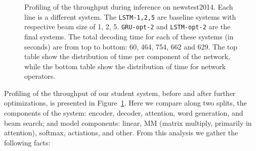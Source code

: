 \documentclass[11pt,a4paper]{article}
\begin{document}
\begin{figure}
\caption{\small Profiling of the throughput during inference on newstest2014. Each line is a different system. The {\tt LSTM-1,2,5} are baseline systems with respective beam size of 1, 2, 5. {\tt GRU-opt-2} and {\tt LSTM-opt-2} are the final systems. The total decoding time for each of these systems (in seconds) are from top to bottom: 60, 464, 754, 662 and 629. The top table show the distribution of time per component of the network, while the bottom table show the distribution of time for network operators.}
\label{fig:decoding_cost}
\end{figure}


Profiling of the throughput of our student system, before
and after further optimizations, is presented in Figure~\ref{fig:decoding_cost}. Here we compare along two splits,
the components of the system: encoder, decoder, attention, word generation, and beam search; and model components: linear, MM (matrix multiply, primarily in attention), softmax, actiations, and other.
From this analysis we gather the following
facts:
\end{document}
